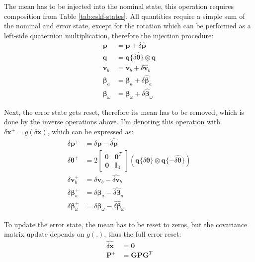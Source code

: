 The mean has to be injected into the nominal state, this operation requires composition from Table \ref{tab:eskf-states}. All quantities require a simple sum of the nominal and error state, except for the rotation which can be performed as a left-side quaternion multiplication, therefore the injection procedure:
\begin{subequations}
\begin{align}
    \mathbf{p} &= \mathbf{p} + \delta\hat{\mathbf{p}} \\
    \mathbf{q} &= \mathbf{q}\{\delta\hat{\boldsymbol{\theta}}\}\otimes\mathbf{q} \\
    \mathbf{v}_b &= \mathbf{v}_b + \delta\hat{\mathbf{v}}_b \\
    \boldsymbol{\beta}_a &= \boldsymbol{\beta}_a + \delta\hat{\boldsymbol{\beta}}_a \\
    \boldsymbol{\beta}_\omega &= \boldsymbol{\beta}_\omega + \delta\hat{\boldsymbol{\beta}}_\omega
\end{align}
\end{subequations}

Next, the error state gets reset, therefore its mean has to be removed, which is done by the inverse operations above. I'm denoting this operation with $\delta\mathbf{x}^+=g(\delta\mathbf{x})$, which can be expressed as:
\begin{subequations}
\begin{align}
    \delta\mathbf{p}^+ &= \delta\mathbf{p} - \hat{\delta\mathbf{p}}\\
    \delta\boldsymbol{\theta}^+ &= 2\begin{bmatrix}
        0 & \mathbf{0}^T \\
        \mathbf{0} & \mathbf{I}_3
    \end{bmatrix}\left(\mathbf{q}\{\delta\boldsymbol{\theta}\}\otimes\mathbf{q}\{-\hat{\delta\boldsymbol{\theta}}\}\right) 
    \label{subeq:g-rotvec}\\
    \delta\mathbf{v}_b^+ &= \delta\mathbf{v}_{b} - \hat{\delta\mathbf{v}}_{b} \\
    \delta\boldsymbol{\beta}_{a}^+ &= \delta\boldsymbol{\beta}_{a} - \hat{\delta\boldsymbol{\beta}}_{a} \\
    \delta\boldsymbol{\beta}_{\omega}^+ &= \delta\boldsymbol{\beta}_{\omega} - \hat{\delta\boldsymbol{\beta}}_{\omega}
\end{align}
\end{subequations}

To update the error state, the mean has to be reset to zeros, but the covariance matrix update depends on $g(.)$, thus the full error reset:
\begin{subequations}
\begin{align}
    \hat{\delta\mathbf{x}} &=\mathbf{0} \\
    \mathbf{P}^+ &= \mathbf{G}\mathbf{P}\mathbf{G}^T
\end{align}    
\end{subequations}

